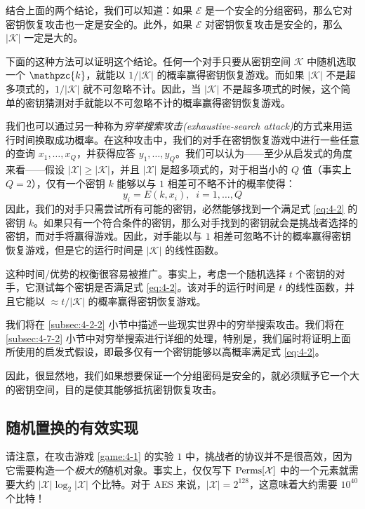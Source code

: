 结合上面的两个结论，我们可以知道：如果 $\mathcal{E}$ 是一个安全的分组密码，那么它对密钥恢复攻击也一定是安全的。此外，如果 $\mathcal{E}$ 对密钥恢复攻击是安全的，那么 $|\mathcal{K}|$ 一定是大的。

下面的这种方法可以证明这个结论。任何一个对手只要从密钥空间 $\mathcal{K}$ 中随机选取一个 $\mathpzc{k}$，就能以 ${1}/{|\mathcal{K}|}$ 的概率赢得密钥恢复游戏。而如果 $|\mathcal{K}|$ 不是超多项式的，${1}/{|\mathcal{K}|}$ 就不可忽略不计。因此，当 $|\mathcal{K}|$ 不是超多项式的时候，这个简单的密钥猜测对手就能以不可忽略不计的概率赢得密钥恢复游戏。

我们也可以通过另一种称为\emph{穷举搜索攻击(exhaustive-search attack)}的方式来用运行时间换取成功概率。在这种攻击中，我们的对手在密钥恢复游戏中进行一些任意的查询 $x_1,\dots,x_Q$，并获得应答 $y_1,\dots,y_Q$。我们可以认为——至少从启发式的角度来看——假设 $|\mathcal{X}|\geq|\mathcal{K}|$，并且 $|\mathcal{X}|$ 是超多项式的，对于相当小的 $Q$ 值（事实上 $Q=2$），仅有一个密钥 $k$ 能够以与 $1$ 相差可不略不计的概率使得：
\begin{equation}\label{eq:4-2}
y_i=E(k,x_i),
\;\;
i=1,\dots,Q
\end{equation}
因此，我们的对手只需尝试所有可能的密钥，必然能够找到一个满足式 \ref{eq:4-2} 的密钥 $k$。如果只有一个符合条件的密钥，那么对手找到的密钥就会是挑战者选择的密钥，而对手将赢得游戏。因此，对手能以与 $1$ 相差可忽略不计的概率赢得密钥恢复游戏，但是它的运行时间是 $|\mathcal{K}|$ 的线性函数。

这种时间/优势的权衡很容易被推广。事实上，考虑一个随机选择 $t$ 个密钥的对手，它测试每个密钥是否满足式 \ref{eq:4-2}。该对手的运行时间是 $t$ 的线性函数，并且它能以 $\approx{t}/{|\mathcal{K}|}$ 的概率赢得密钥恢复游戏。

我们将在 \ref{subsec:4-2-2} 小节中描述一些现实世界中的穷举搜索攻击。我们将在 \ref{subsec:4-7-2} 小节中对穷举搜索进行详细的处理，特别是，我们届时将证明上面所使用的启发式假设，即最多仅有一个密钥能够以高概率满足式 \ref{eq:4-2}。

因此，很显然地，我们如果想要保证一个分组密码是安全的，就必须赋予它一个大的密钥空间，目的是使其能够抵抗密钥恢复攻击。

\subsection{随机置换的有效实现}\label{subsec:4-1-2}

请注意，在攻击游戏 \ref{game:4-1} 的实验 $1$ 中，挑战者的协议并不是很高效，因为它需要构造一个\emph{极大的}随机对象。事实上，仅仅写下 ${\rm Perms}[\mathcal{X}]$ 中的一个元素就需要大约 $|\mathcal{X}|\log_2|\mathcal{X}|$ 个比特。对于 AES 来说，$|\mathcal{X}|=2^{128}$，这意味着大约需要 $10^{40}$ 个比特！


